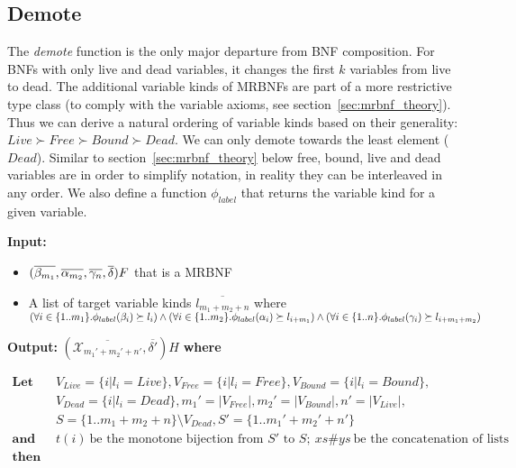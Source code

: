 \subsection{Demote}\label{sec:demote}

The \textit{demote} function is the only major departure from \ac{BNF} composition. For \acp{BNF} with only live and dead variables, it changes the first $k$ variables from live to dead. The additional variable kinds of \acp{MRBNF} are part of a more restrictive type class (to comply with the variable axioms, see section~\ref{sec:mrbnf_theory}). Thus we can derive a natural ordering of variable kinds based on their generality: $Live \succ Free \succ Bound \succ Dead$. We can only demote towards the least element ($Dead$). Similar to section~\ref{sec:mrbnf_theory} below free, bound, live and dead variables are in order to simplify notation, in reality they can be interleaved in any order. We also define a function $\phi_{label}$ that returns the variable kind for a given variable.

\newcommand{\lab}[1]{\phi_{label}(#1)}

\vspace*{1em}
\noindent
\textbf{Input:}
\begin{itemize}
\item{$(\overline{\beta_{m_1}}, \overline{\alpha_{m_2}}, \overline{\gamma_n}, \overline{\delta}) F$ that is a \ac{MRBNF}}
\item{A list of target variable kinds $\overline{l_{m_1+m_2+n}}$ where $(\forall i \in \{1..m_1\}. \lab{\beta_i} \succeq l_i) \wedge \\
(\forall i \in \{1..m_2\}. \lab{\alpha_i} \succeq l_{i+m_1}) \wedge (\forall i \in \{1..n\}. \lab{\gamma_i} \succeq l_{i+m_1+m_2})$}
\end{itemize}

\noindent
\textbf{Output:} $(\overline{\mathcal{X}_{m_1'+m_2'+n'}}, \overline{\delta'})H$ \textbf{where}

\hspace*{\parindent-1.7em}
$\begin{array}{ll}
\textbf{Let} \quad & V_{Live} = \{ i | l_i = Live \}, V_{Free} = \{ i | l_i = Free \}, V_{Bound} = \{ i | l_i = Bound \}, \\
& V_{Dead} = \{ i | l_i = Dead \}, m_1' = |V_{Free}|, m_2' = |V_{Bound}|, n' = |V_{Live}|, \\
& S = \{1..m_1+m_2+n\} \setminus V_{Dead}, S' = \{1..m_1'+m_2'+n'\} \\
\textbf{and} & t(i) \: \text{be the monotone bijection from $S'$ to $S$}; \: xs \# ys \: \text{be the concatenation of lists} \\
\textbf{then} & \\
\end{array}$\vspace{-1em}

